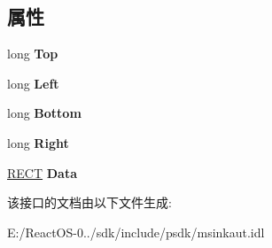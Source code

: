 \subsection*{属性}
\begin{DoxyCompactItemize}
\item 
\mbox{\label{interface_m_s_i_n_k_a_u_t_lib_1_1_i_ink_rectangle_ac8c462a9ab22ccb6bc441ae0a3e4e24f}} 
long {\bfseries Top}
\item 
\mbox{\label{interface_m_s_i_n_k_a_u_t_lib_1_1_i_ink_rectangle_a0ab47ec229304dac12e1968620c681de}} 
long {\bfseries Left}
\item 
\mbox{\label{interface_m_s_i_n_k_a_u_t_lib_1_1_i_ink_rectangle_a719d461a521d094eaeefcb59bbed395d}} 
long {\bfseries Bottom}
\item 
\mbox{\label{interface_m_s_i_n_k_a_u_t_lib_1_1_i_ink_rectangle_a48a3944b71290a2d0f05900c16261bfb}} 
long {\bfseries Right}
\item 
\mbox{\label{interface_m_s_i_n_k_a_u_t_lib_1_1_i_ink_rectangle_ab67cf834453637e3bfba73724ba8779d}} 
\hyperlink{structtag_r_e_c_t}{R\+E\+CT} {\bfseries Data}
\end{DoxyCompactItemize}


该接口的文档由以下文件生成\+:\begin{DoxyCompactItemize}
\item 
E\+:/\+React\+O\+S-\/0../sdk/include/psdk/msinkaut.\+idl\end{DoxyCompactItemize}

